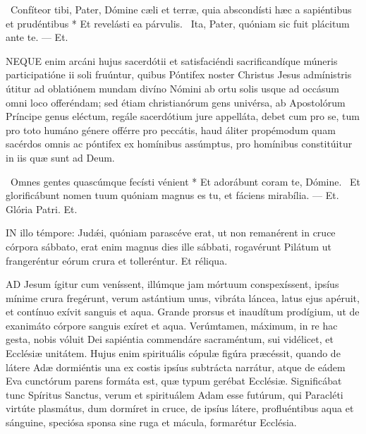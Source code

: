 \R\ Confíteor tibi, Pater, Dómine cæli et terræ, quia abscondísti hæc a sapiéntibus et prudéntibus * Et revelásti ea párvulis. \V\ Ita, Pater, quóniam sic fuit plácitum ante te. --- Et.


\lettrine[lines=2]{N}{EQUE} enim arcáni hujus sacerdótii et satisfaciéndi sacrificandíque múneris participatióne ii soli fruúntur, quibus Póntifex noster Christus Jesus admínistris útitur ad oblatiónem mundam divíno Nómini ab ortu solis usque ad occásum omni loco offeréndam; sed étiam christianórum gens univérsa, ab Apostolórum Príncipe genus eléctum, regále sacerdótium jure appelláta, debet cum pro se, tum pro toto humáno génere offérre pro peccátis, haud áliter propémodum quam sacérdos omnis ac póntifex ex homínibus assúmptus, pro homínibus constitúitur in iis quæ sunt ad Deum.

\R\ Omnes gentes quascúmque fecísti vénient * Et adorábunt coram te, Dómine. \V\ Et glorificábunt nomen tuum quóniam magnus es tu, et fáciens mirabília. --- Et. Glória Patri. Et.




\lettrine[lines=2]{I}{N} illo témpore: Judǽi, quóniam parascéve erat, ut non remanérent in cruce córpora sábbato, erat enim magnus dies ille sábbati, rogavérunt Pilátum ut frangeréntur eórum crura et tolleréntur. Et réliqua.



\lettrine[lines=2]{A}{D} Jesum ígitur cum veníssent, illúmque jam mórtuum conspexíssent, ipsíus mínime crura fregérunt, verum astántium unus, vibráta láncea, latus ejus apéruit, et contínuo exívit sanguis et aqua. Grande prorsus et inaudítum prodígium, ut de exanimáto córpore sanguis exíret et aqua. Verúmtamen, máximum, in re hac gesta, nobis vóluit Dei sapiéntia commendáre sacraméntum, sui vidélicet, et Ecclésiæ unitátem. Hujus enim spirituális cópulæ figúra præcéssit, quando de látere Adæ dormiéntis una ex costis ipsíus subtrácta narrátur, atque de eádem Eva cunctórum parens formáta est, quæ typum gerébat Ecclésiæ. Significábat tunc Spíritus Sanctus, verum et spirituálem Adam esse futúrum, qui Paracléti virtúte plasmátus, dum dormíret in cruce, de ipsíus látere, profluéntibus aqua et sánguine, speciósa sponsa sine ruga et mácula, formarétur Ecclésia.


